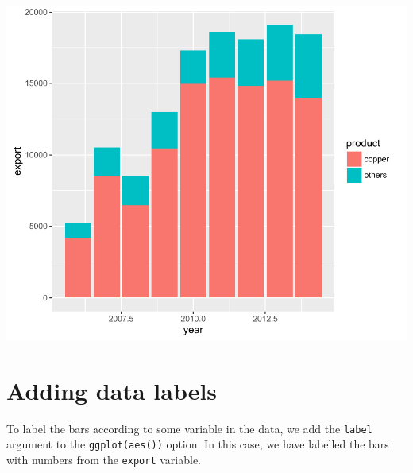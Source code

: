 \begin{Shaded}
\begin{Highlighting}[]
\StringTok{ }\NormalTok{() +}\StringTok{ }\NormalTok{(}\NormalTok{(}   
   \NormalTok{)}
\end{Highlighting}
\end{Shaded}

\begin{center}\includegraphics[width=0.6\linewidth]{3_Bar_Plots_pdf/bar_1-1} \end{center}

\section{Adding data labels}\label{adding-data-labels}

To label the bars according to some variable in the data, we add the
\texttt{label} argument to the \texttt{ggplot(aes())} option. In this
case, we have labelled the bars with numbers from the \texttt{export}
variable.

\begin{Shaded}
\begin{Highlighting}[]
\StringTok{ }\StringTok{ }\NormalTok{(}\NormalTok{(}   
  \NormalTok{)}
\end{Highlighting}
\end{Shaded}

